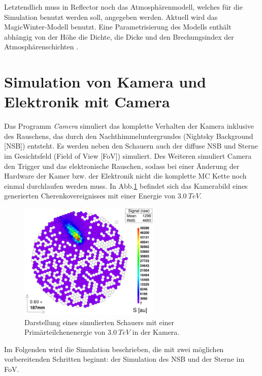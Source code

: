 Letztendlich muss in Reflector noch das Atmosphärenmodell, welches für die Simulation benutzt werden soll, angegeben werden. 
Aktuell wird das MagicWinter-Modell benutzt. 
Eine Parametrisierung des Modells enthält abhängig von der Höhe die Dichte, die Dicke und den Brechungsindex der Atmosphärenschichten \cite{Haffke}.


\section{Simulation von Kamera und Elektronik mit Camera}
\label{sec:Camera}
Das Programm \textit{Camera}\cite{Camera} simuliert das komplette Verhalten der Kamera inklusive des Rauschens, das durch den Nachthimmeluntergrundes (Nightsky Background [NSB]) entsteht.
Es werden neben den Schauern auch der diffuse NSB und Sterne im Gesichtsfeld (Field of View [FoV]) simuliert. 
Des Weiteren simuliert Camera den Trigger und das elektronische Rauschen, sodass bei einer Änderung der Hardware der Kamer bzw. der Elektronik nicht die komplette MC Kette noch einmal durchlaufen werden muss.
In Abb.\ref{Kamera-Bild} befindet sich das Kamerabild eines generierten Cherenkovereignisses mit einer Energie von $\SI{3.0}{TeV}$.

\begin{figure}
    \centering
    \includegraphics[width=0.6\textwidth]{./Plots/03_MonteCarlos/Signal_Job481_RunNr1513276_511_e3.0TeV_Zd32.2_fertig.png}
    \caption{Darstellung eines simulierten Schauers mit einer Primärteilchenenergie von $\SI{3.0}{TeV}$ in der Kamera.}
    \label{Kamera-Bild}
\end{figure}

Im Folgenden wird die Simulation beschrieben, die mit zwei möglichen vorbereitenden Schritten beginnt: der Simulation des NSB und der Sterne im FoV.

